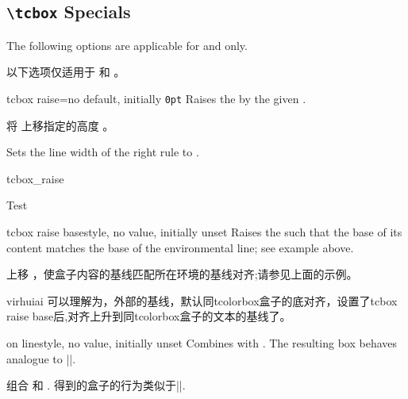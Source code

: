 \subsection{\texttt{\textbackslash tcbox} Specials}

The following options are applicable for  and 
only.

以下选项仅适用于  和 。
\begin{docTcbKey}{tcbox raise}{=}{no default, initially \texttt{0pt}}
Raises the  by the given .

将  上移指定的高度 。

Sets the line width of the right rule to .
\begin{exdispExample}{tcbox_raise}

Test\dotfill
{}\dotfill
{}\dotfill
{}
\end{exdispExample}
\end{docTcbKey}


\begin{docTcbKey}{tcbox raise base}{}{style, no value, initially unset}
Raises the  such that the base of its content matches
the base of the environmental line; see example above.

上移  ，使盒子内容的基线匹配所在环境的基线对齐;请参见上面的示例。

\begin{引述之言}{virhuiai}
可以理解为，外部的基线，默认同tcolorbox盒子的底对齐，设置了tcbox raise base后,对齐上升到同tcolorbox盒子的文本的基线了。
\end{引述之言}
\end{docTcbKey}

\begin{docTcbKey}{on line}{}{style, no value, initially unset}
Combines  with .
The resulting box behaves analogue to |\fbox|.

组合  和 .
得到的盒子的行为类似于|\fbox|.
\end{docTcbKey}




